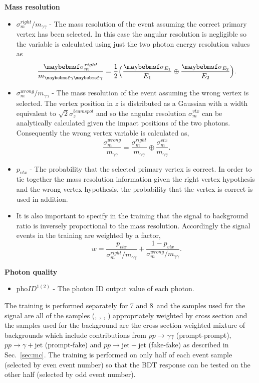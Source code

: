 \noindent\textbf{Mass resolution}
\begin{itemize}
  \item $\sigma_{m}^{right}/m_{\gamma\gamma}$ - The mass resolution of the event assuming the correct primary vertex has been selected. In this case the angular resolution is negligible so the variable is calculated using just the two photon energy resolution values as
    \begin{equation}
      \frac{\sigma_{m}^{right}}{m_{\gamma\gamma}} = \frac{1}{2}\Bigl(\frac{\sigma_{E_{1}}}{E_{1}} \oplus \frac{\sigma_{E_{2}}}{E_{2}}\Bigr).
    \end{equation}
  \item $\sigma_{m}^{wrong}/m_{\gamma\gamma}$ - The mass resolution of the event assuming the wrong vertex is selected. The vertex position in $z$ is distributed as a Gaussian with a width equivalent to $\sqrt{2}\sigma_{z}^{beamspot}$ and so the angular resolution $\sigma_{m}^{vtx}$ can be analytically calculated given the \ECAL impact positions of the two photons. Consequently the wrong vertex variable is calculated as,
    \begin{equation}
      \frac{\sigma_{m}^{wrong}}{m_{\gamma\gamma}} = \frac{\sigma_{m}^{right}}{m_{\gamma\gamma}} \oplus \frac{\sigma_{m}^{vtx}}{m_{\gamma\gamma}}.
    \end{equation}
  \item $p_{vtx}$ - The probability that the selected primary vertex is correct. In order to tie together the mass resolution information given the right vertex hypothesis and the wrong vertex hypothesis, the probability that the vertex is correct is used in addition.
  \item It is also important to specify in the training that the signal to background ratio is inversely proportional to the mass resolution. Accordingly the signal events in the training are weighted by a factor,
    \begin{equation}
      w = \frac{p_{vtx}}{\sigma_{m}^{right}/m_{\gamma\gamma}} + \frac{1-p_{vtx}}{\sigma_{m}^{wrong}/m_{\gamma\gamma}}.
    \end{equation}
\end{itemize}

\noindent\textbf{Photon quality}
\begin{itemize}
  \item pho$ID^{1(2)}$ - The photon ID \BDT output value of each photon.
\end{itemize}

The training is performed separately for 7 and 8~\TeV and the samples used for the signal are all of the \SM \Hgg \MC samples (\ggH, \VBF, \VH, \ttH) appropriately weighted by cross section and the samples used for the background are the cross section-weighted mixture of \SM backgrounds which include contributions from $pp\rightarrow\gamma\gamma$ (prompt-prompt), $pp\rightarrow\gamma+\mathrm{jet}$ (prompt-fake) and $pp\rightarrow\mathrm{jet+jet}$ (fake-fake) as described in Sec.~\ref{sec:mc}. The training is performed on only half of each event sample (selected by even event number) so that the BDT response can be tested on the other half (selected by odd event number).

